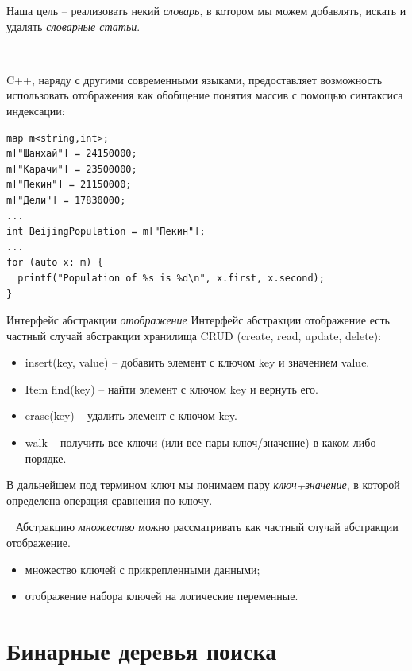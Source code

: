\documentclass{beamer}
\begin{document}
\begin{frame}[fragile, t]	
	Наша цель -- реализовать некий \textit{словарь}, в котором мы можем добавлять, искать и удалять \textit{словарные статьи}.

	~
	
	C++, наряду с другими современными языками, предоставляет возможность использовать отображения как обобщение понятия массив с помощью синтаксиса индексации:
	\begin{verbatim}
map m<string,int>;
m["Шанхай"] = 24150000;
m["Карачи"] = 23500000;
m["Пекин"] = 21150000;
m["Дели"] = 17830000;
...
int BeijingPopulation = m["Пекин"];
...
for (auto x: m) {
  printf("Population of %s is %d\n", x.first, x.second);
}	
	\end{verbatim}
\end{frame} 

\begin{frame}[t]{Интерфейс абстракции \textit{отображение}}
	Интерфейс абстракции отображение есть частный случай абстракции хранилища CRUD (create, read, update, delete):
	\begin{itemize}
		\item insert(key, value) -- добавить элемент с ключом key и значением value.
		\item Item find(key) -- найти элемент с ключом key и вернуть его.
		\item erase(key) -- удалить элемент с ключом key.
		\item walk -- получить все ключи (или все пары ключ/значение) в каком-либо порядке.
	\end{itemize}		
	В дальнейшем под термином ключ мы понимаем пару \textit{ключ+значение}, в которой определена операция сравнения по ключу.

	~
	Абстракцию \textit{множество} можно рассматривать как частный случай абстракции отображение.
	\begin{itemize}
		\item множество ключей с прикрепленными данными;
		\item отображение набора ключей на логические переменные.
	\end{itemize}
\end{frame}

\section{Бинарные деревья поиска}
  
\end{document}
